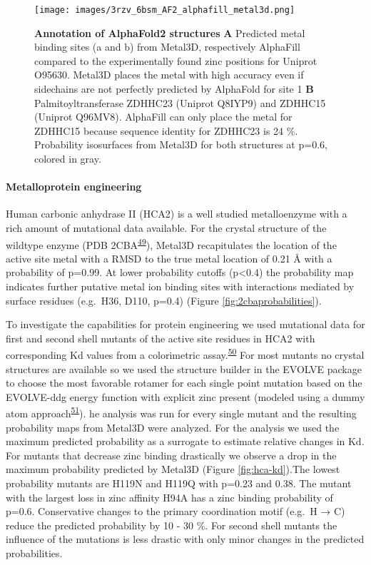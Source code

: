\documentclass[  ASAPversion,
  ,
  9pt]{elife}
\begin{document}
\begin{figure}
\hypertarget{fig:alphafold}{%
\centering
\texttt{[image: images/3rzv\_6bsm\_AF2\_alphafill\_metal3d.png]}
\caption{\textbf{Annotation of AlphaFold2 structures} \textbf{A} Predicted metal binding sites (a and b) from Metal3D, respectively AlphaFill compared to the experimentally found zinc positions for Uniprot O95630. Metal3D places the metal with high accuracy even if sidechains are not perfectly predicted by AlphaFold for site 1 \textbf{B} Palmitoyltransferase ZDHHC23 (Uniprot Q8IYP9) and ZDHHC15 (Uniprot Q96MV8). AlphaFill can only place the metal for ZDHHC15 because sequence identity for ZDHHC23 is 24 \%. Probability isosurfaces from Metal3D for both structures at p=0.6, colored in gray.}\label{fig:alphafold}
}
\end{figure}

\hypertarget{metalloprotein-engineering}{%
\paragraph{Metalloprotein engineering}\label{metalloprotein-engineering}}

Human carbonic anhydrase II (HCA2) is a well studied metalloenzyme with a rich amount of mutational data available. For the crystal structure of the wildtype enzyme (PDB 2CBA\textsuperscript{\protect\hyperlink{ref-jyFnBdWm}{49}}), Metal3D recapitulates the location of the active site metal with a RMSD to the true metal location of 0.21 Å with a probability of p=0.99. At lower probability cutoffs (p\textless0.4) the probability map indicates further putative metal ion binding sites with interactions mediated by surface residues (e.g.~H36, D110, p=0.4) (Figure \ref{fig:2cbaprobabilities}).

To investigate the capabilities for protein engineering we used mutational data for first and second shell mutants of the active site residues in HCA2 with corresponding Kd values from a colorimetric assay.\textsuperscript{\protect\hyperlink{ref-13XuOF3Jj}{50}} For most mutants no crystal structures are available so we used the structure builder in the EVOLVE package to choose the most favorable rotamer for each single point mutation based on the EVOLVE-ddg energy function with explicit zinc present (modeled using a dummy atom approach\textsuperscript{\protect\hyperlink{ref-pchdLF0k}{51}}). he analysis was run for every single mutant and the resulting probability maps from Metal3D were analyzed. For the analysis we used the maximum predicted probability as a surrogate to estimate relative changes in Kd. For mutants that decrease zinc binding drastically we observe a drop in the maximum probability predicted by Metal3D (Figure \ref{fig:hca-kd}).The lowest probability mutants are H119N and H119Q with p=0.23 and 0.38. The mutant with the largest loss in zinc affinity H94A has a zinc binding probability of p=0.6. Conservative changes to the primary coordination motif (e.g.~H → C) reduce the predicted probability by 10 - 30 \%. For second shell mutants the influence of the mutations is less drastic with only minor changes in the predicted probabilities.
\end{document}
